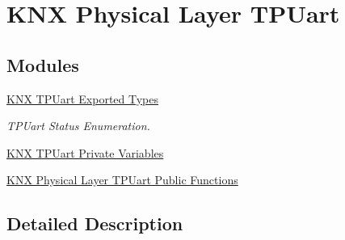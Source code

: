 \hypertarget{group___k_n_x___p_h___t_p_uart}{}\section{K\+NX Physical Layer T\+P\+Uart}
\label{group___k_n_x___p_h___t_p_uart}
\subsection*{Modules}
\begin{DoxyCompactItemize}
\item 
\hyperlink{group___k_n_x___t_p_uart___exported___types}{K\+N\+X T\+P\+Uart Exported Types}
\begin{DoxyCompactList}\small\item\em T\+P\+Uart Status Enumeration. \end{DoxyCompactList}\item 
\hyperlink{group___k_n_x___p_h___t_p_u_a_r_t___private___variables}{K\+N\+X T\+P\+Uart Private Variables}
\item 
\hyperlink{group___k_n_x___p_h___t_p_uart___exported___functions}{K\+N\+X Physical Layer T\+P\+Uart Public Functions}
\end{DoxyCompactItemize}


\subsection{Detailed Description}
